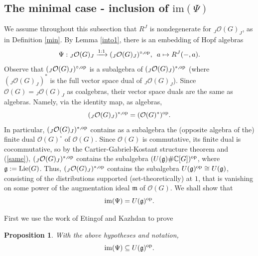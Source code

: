 \documentclass{amsart}
\numberwithin{equation}{section}
\newtheorem{proposition}[theorem]{Proposition}
\theoremstyle{definition}
\begin{document}
\subsection{The minimal case - inclusion of $\mathrm{im}(\Psi)$}\label{minimal1} 
We assume throughout this subsection that $R^J$ is nondegenerate for ${}_J\mathcal{O}(G)_J$, as in Definition \ref{min}. By Lemma \ref{into1}, there is an embedding of Hopf algebras
\begin{equation}\label{caught}     
\Psi: {}_J\mathcal{O}(G)_J \xrightarrow{1:1} ({}_J\mathcal{O}(G)_J)^{\circ, {\rm op}},\,\,\, a \mapsto R^J(-,a). 
\end{equation}
Observe that $({}_J\mathcal{O}(G)_J)^{\circ, {\rm op}}$ is a subalgebra of $({}_J\mathcal{O}(G)_J)^{*,{\rm op}}$ (where $(_J\mathcal{O}(G)_J)^*$ is the full vector space dual of ${}_J\mathcal{O}(G)_J$). Since $\mathcal{O}(G)={}_J\mathcal{O}(G)_J$ as coalgebras, their vector space duals are the same as algebras. Namely, via the identity map, as algebras,
\begin{equation}\label{same} ({}_J\mathcal{O}(G)_J)^{*,{\rm op}}= (\mathcal{O}(G)^*)^{{\rm op}}.
\end{equation}
In particular, $({}_J\mathcal{O}(G)_J)^{*,{\rm op}}$ contains as a subalgebra the (opposite algebra of the) finite dual $\mathcal{O}(G)^{\circ}$ of $\mathcal{O}(G)$. Since $\mathcal{O}(G)$ is commutative, its finite dual is cocommutative, so by the Cartier-Gabriel-Kostant structure theorem \cite[Corollary 5.6.4(3) and Theorem 5.6.5]{M} and (\ref{same}), $ ({}_J\mathcal{O}(G)_J)^{*,{\rm op}}$ contains the subalgebra $(U(\mathfrak{g})\#\mathbb{C}[G])^{{\rm op}}$, where $\mathfrak{g}:={\rm Lie}(G)$. Thus, $({}_J\mathcal{O}(G)_J)^{*,{\rm op}}$ contains the subalgebra $U(\mathfrak{g})^{{\rm op}} \cong U(\mathfrak{g})$, consisting of the distributions supported (set-theoretically) at $1$, that is vanishing on some power of the augmentation ideal $\mathfrak{m}$ of $\mathcal{O}(G)$. We shall show that 
\begin{equation}\label{image} \mathrm{im}(\Psi) = U(\mathfrak{g})^{{\rm op}}.
\end{equation}

First we use the work of Etingof and Kazhdan \cite{EK} to prove

\begin{proposition}\label{include}
With the above hypotheses and notation,
$$\mathrm{im}(\Psi) \subseteq U(\mathfrak{g})^{{\rm op}}.$$
\end{proposition}
\end{document}
